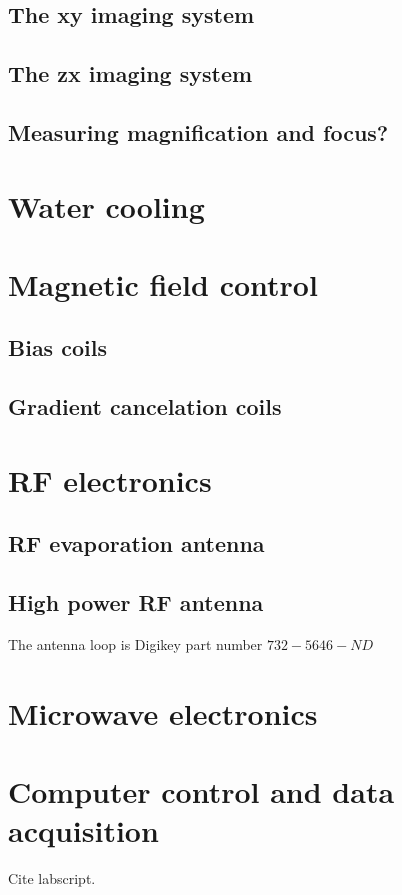 \subsection{The xy imaging system}
\subsection{The zx imaging system}
\subsection{Measuring magnification and focus?}

\section{Water cooling}

\section{Magnetic field control}
\subsection{Bias coils}
\subsection{Gradient cancelation coils}

\section{RF electronics}
\subsection{RF evaporation antenna}
\subsection{High power RF antenna}
\label{sec:high_power_rf_antenna}
The antenna loop is Digikey part number $732-5646-ND$

\section{Microwave electronics}

\section{Computer control and data acquisition}
Cite labscript. 
